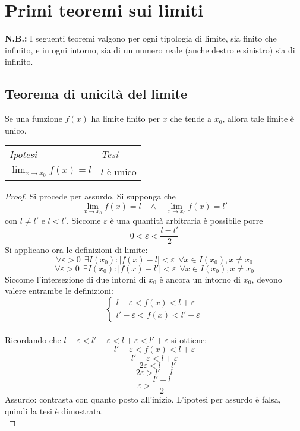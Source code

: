 \documentclass{book}     %
\begin{document}
\section{Primi teoremi sui limiti}
\textbf{N.B.:} I seguenti teoremi valgono per ogni tipologia di limite, sia finito che infinito, e in ogni intorno, sia di un numero reale (anche destro e sinistro) sia di infinito.
    \subsection{Teorema di unicità del limite}
        \begin{shadedTheorem}
            Se una funzione $f(x)$ ha limite finito per $x$ che tende a $x_0$, allora tale limite è unico.
        \end{shadedTheorem}
        \begin{tabular}{m{}m{}}
            \textit{Ipotesi} & \textit{Tesi}  \\
            $\displaystyle\lim_{x\rightarrow x_0}f(x) = l$ & $l$ è unico
        \end{tabular}
        
        \begin{proof}
        Si procede per assurdo. Si supponga che 
        \[\lim_{x\rightarrow x_0}f(x) = l~~~~\land~~~~ \lim_{x\rightarrow x_0}f(x) = l'\]
        con $l\neq l'$ e $l<l'$.
        Siccome $\varepsilon$ è una quantità arbitraria è possibile porre \[0<\varepsilon<\frac{l-l'}{2}\]
        Si applicano ora le definizioni di limite:
        \[\forall \varepsilon > 0 ~~\exists I(x_0) : |f(x)-l|<\varepsilon~~\forall x \in I(x_0), x\neq x_0\]
        \[\forall \varepsilon > 0 ~~\exists I(x_0) : |f(x)-l'|<\varepsilon~~\forall x \in I(x_0), x\neq x_0\]
        Siccome l'intersezione di due intorni di $x_0$ è ancora un intorno di $x_0$, devono valere entrambe le definizioni:
        \[\left\{\begin{array}{l}
            l-\varepsilon < f(x) < l+\varepsilon\\
            l'-\varepsilon < f(x) < l'+\varepsilon 
        \end{array}\right.\]
        \\Ricordando che $l-\varepsilon<l'-\varepsilon < l+\varepsilon < l'+\varepsilon$ si ottiene:
        \[l'-\varepsilon < f(x) < l+\varepsilon\]
        \[l'-\varepsilon < l+\varepsilon\]
        \[-2\varepsilon<l-l'\]
        \[2\varepsilon > l'-l\]
        \[\varepsilon > \frac{l'-l}{2}\]
        Assurdo: contrasta con quanto posto all'inizio. L'ipotesi per assurdo è falsa, quindi la tesi è dimostrata.\\
        \end{proof}
        
\end{document}
